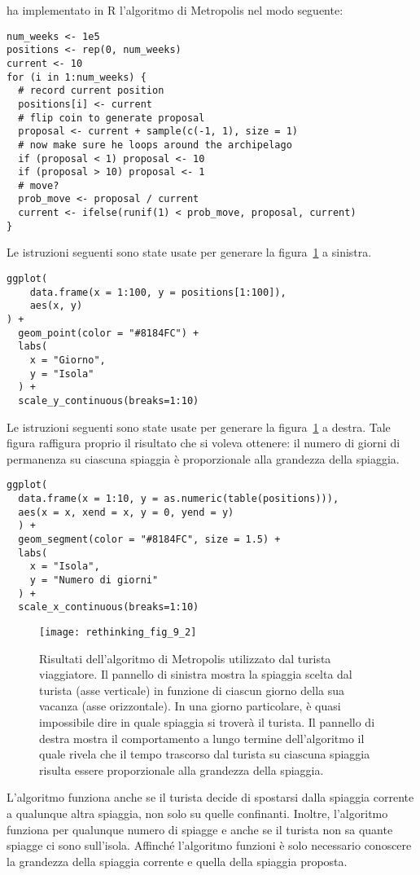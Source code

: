 \citet{stat_rethinking} ha implementato in \textsf{R} l'algoritmo di Metropolis nel modo seguente:
\begin{lstlisting}
num_weeks <- 1e5
positions <- rep(0, num_weeks)
current <- 10
for (i in 1:num_weeks) {
  # record current position
  positions[i] <- current
  # flip coin to generate proposal
  proposal <- current + sample(c(-1, 1), size = 1)
  # now make sure he loops around the archipelago
  if (proposal < 1) proposal <- 10
  if (proposal > 10) proposal <- 1
  # move?
  prob_move <- proposal / current
  current <- ifelse(runif(1) < prob_move, proposal, current)
}
\end{lstlisting}
Le istruzioni seguenti sono state usate per generare la figura~\ref{fig:rethinking_fig_9_2} a sinistra.
 \begin{lstlisting}
ggplot(
    data.frame(x = 1:100, y = positions[1:100]),
    aes(x, y)
) +
  geom_point(color = "#8184FC") +
  labs(
    x = "Giorno",
    y = "Isola"
  ) +
  scale_y_continuous(breaks=1:10)
\end{lstlisting}
Le istruzioni seguenti sono state usate per generare la figura~\ref{fig:rethinking_fig_9_2} a destra.
Tale figura raffigura proprio il risultato che si voleva ottenere: il numero di giorni di permanenza su ciascuna spiaggia è proporzionale alla grandezza della spiaggia. 
\begin{lstlisting}
ggplot(
  data.frame(x = 1:10, y = as.numeric(table(positions))),
  aes(x = x, xend = x, y = 0, yend = y)
  ) +
  geom_segment(color = "#8184FC", size = 1.5) +
  labs(
    x = "Isola",
    y = "Numero di giorni"
  ) +
  scale_x_continuous(breaks=1:10)
\end{lstlisting}


\begin{figure}[h!]
 \centering
 \texttt{[image: rethinking\_fig\_9\_2]}
 \caption{
Risultati dell'algoritmo di Metropolis utilizzato dal turista viaggiatore. Il pannello di sinistra mostra la spiaggia scelta dal turista (asse verticale) in funzione di ciascun giorno della sua vacanza (asse orizzontale). In una giorno particolare, è quasi impossibile dire in quale spiaggia si troverà il turista. Il pannello di destra mostra il comportamento a lungo termine dell'algoritmo il quale rivela che il tempo trascorso dal turista su ciascuna spiaggia risulta essere proporzionale alla grandezza della spiaggia.
 }
 \label{fig:rethinking_fig_9_2}
 \end{figure}
 
L'algoritmo funziona anche se il turista decide di spostarsi dalla spiaggia corrente a qualunque altra spiaggia, non solo su quelle confinanti. 
Inoltre, l'algoritmo funziona per qualunque numero di spiagge e anche se il turista non sa quante spiagge ci sono sull'isola.
Affinché l'algoritmo funzioni è solo necessario conoscere la grandezza della spiaggia corrente e quella della spiaggia proposta.

